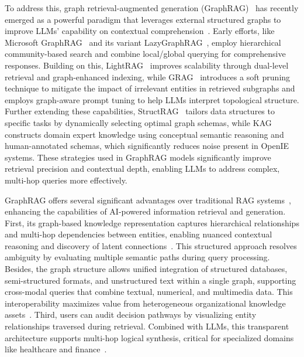\documentclass{article} %
\begin{document}
 To address this, graph retrieval-augmented generation (GraphRAG)~\citep{peng2024graph,procko2024graph} has recently emerged as a powerful paradigm that leverages external structured graphs to improve LLMs' capability on contextual comprehension~\citep{han2024retrieval,zhang2025survey}. Early efforts, like Microsoft GraphRAG~\citep{edge2024local} and its variant LazyGraphRAG~\citep{LazyGraphRAG}, employ hierarchical community-based search and combine local/global querying for comprehensive responses. Building on this, LightRAG~\citep{guo2024lightrag} improves scalability through dual-level retrieval and graph-enhanced indexing, while GRAG~\citep{hu2024grag} introduces a soft pruning technique to mitigate the impact of irrelevant entities in retrieved subgraphs and employs graph-aware prompt tuning to help LLMs interpret topological structure. Further extending these capabilities, StructRAG~\citep{li2024structrag} tailors data structures to specific tasks by dynamically selecting optimal graph schemas, while KAG~\citep{liang2024kag} constructs domain expert knowledge using conceptual semantic reasoning and human-annotated schemas, which significantly reduces noise present in OpenIE systems. These strategies used in GraphRAG models significantly improve retrieval precision and contextual depth, enabling LLMs to address complex, multi-hop queries more effectively. 

GraphRAG offers several significant advantages over traditional RAG systems~\citep{peng2024graph}, enhancing the capabilities of AI-powered information retrieval and generation. First, its graph-based knowledge representation captures hierarchical relationships and multi-hop dependencies between entities, enabling nuanced contextual reasoning and discovery of latent connections~\cite{yang2026graph}. This structured approach resolves ambiguity by evaluating multiple semantic paths during query processing.  Besides, the graph structure allows unified integration of structured databases, semi-structured formats, and unstructured text within a single graph, supporting cross-modal queries that combine textual, numerical, and multimedia data. This interoperability maximizes value from heterogeneous organizational knowledge assets~\citep{procko2024graph,luo2024fairgt,luo2025fairgp,gllongsurvey2025}.  Third, users can audit decision pathways by visualizing entity relationships traversed during retrieval. Combined with LLMs, this transparent architecture supports multi-hop logical synthesis, critical for specialized domains like healthcare and finance~\citep{procko2024graph,han2024retrieval}.
\end{document}
